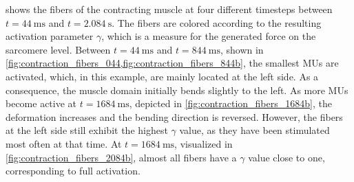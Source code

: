  shows the fibers of the contracting muscle at four different timesteps between $t=\SI{44}{\ms}$ and $t=\SI{2.084}{\s}$. The fibers are colored according to the resulting activation parameter $\gamma$, which is a measure for the generated force on the sarcomere level. Between $t=\SI{44}{\ms}$ and $t=\SI{844}{\ms}$, shown in \cref{fig:contraction_fibers_044,fig:contraction_fibers_844b}, the smallest MUs are activated, which, in this example, are mainly located at the left side. As a consequence, the muscle domain initially bends slightly to the left. As more MUs become active at $t=\SI{1684}{\ms}$, depicted in \cref{fig:contraction_fibers_1684b}, the deformation increases and the bending direction is reversed. However, the fibers at the left side still exhibit the highest $\gamma$ value, as they have been stimulated most often at that time.
At $t=\SI{1684}{\ms}$, visualized in \cref{fig:contraction_fibers_2084b}, almost all fibers have a $\gamma$ value close to one, corresponding to full activation.

